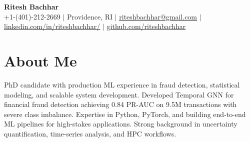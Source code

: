 \documentclass[letterpaper,10pt]{article}
\begin{document}

\begin{center}
    \textbf{\Huge Ritesh Bachhar} \\ \vspace{1pt}
    \small +1-(401)-212-2669 $|$ Providence, RI $|$
    \href{mailto:riteshbachhar@gmail.com}{\underline{riteshbachhar@gmail.com}} $|$ 
    \href{https://www.linkedin.com/in/riteshbachhar/}{\underline{linkedin.com/in/riteshbachhar/}} $|$
    \href{https://github.com/riteshbachhar}{\underline{github.com/riteshbachhar}}
\end{center}

\section{About Me}
PhD candidate with production ML experience in fraud detection, statistical modeling, 
and scalable system development. Developed Temporal GNN for financial fraud detection 
achieving 0.84 PR-AUC on 9.5M transactions with severe class imbalance. Expertise in 
Python, PyTorch, and building end-to-end ML pipelines for high-stakes applications. 
Strong background in uncertainty quantification, time-series analysis, and HPC workflows.


\end{document}
